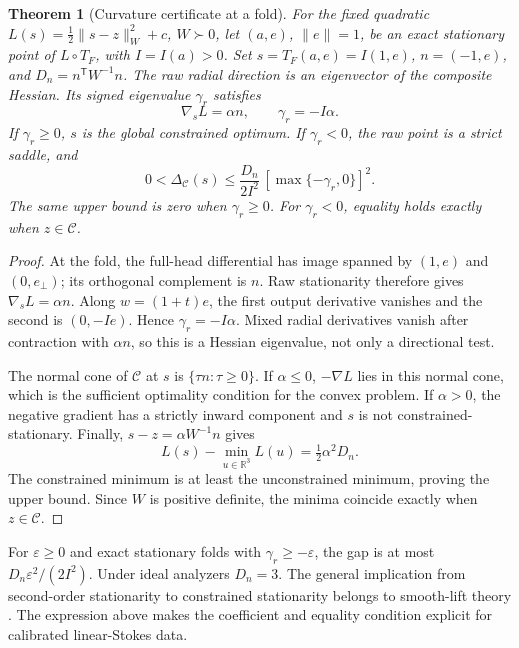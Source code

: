 \documentclass[10pt,a4paper]{article}
\newtheorem{theorem}{Theorem}
\begin{document}
\begin{theorem}[Curvature certificate at a fold]
\label{thm:certificate}
For the fixed quadratic $L(s)=\tfrac12\|s-z\|_W^2+c$, $W\succ0$, let $(a,e)$, $\|e\|=1$, be an exact stationary point of $L\circ T_F$, with $I=I(a)>0$. Set $s=T_F(a,e)=I(1,e)$, $n=(-1,e)$, and $D_n=n^{\mathsf T}W^{-1}n$. The raw radial direction is an eigenvector of the composite Hessian. Its signed eigenvalue $\gamma_r$ satisfies
\begin{equation}
 \nabla_s L=\alpha n,\qquad \gamma_r=-I\alpha.
 \label{eq:normalcurvature}
\end{equation}
If $\gamma_r\geq0$, $s$ is the global constrained optimum. If $\gamma_r<0$, the raw point is a strict saddle, and
\begin{equation}
 0<\Delta_{\mathcal C}(s)\leq
 \frac{D_n}{2I^2}\,[\max\{-\gamma_r,0\}]^2.
 \label{eq:curvaturecertificate}
\end{equation}
The same upper bound is zero when $\gamma_r\geq0$. For $\gamma_r<0$, equality holds exactly when $z\in\mathcal C$.
\end{theorem}
\begin{proof}
At the fold, the full-head differential has image spanned by $(1,e)$ and $(0,e_\perp)$; its orthogonal complement is $n$. Raw stationarity therefore gives $\nabla_sL=\alpha n$. Along $w=(1+t)e$, the first output derivative vanishes and the second is $(0,-Ie)$. Hence $\gamma_r=-I\alpha$. Mixed radial derivatives vanish after contraction with $\alpha n$, so this is a Hessian eigenvalue, not only a directional test.

The normal cone of $\mathcal C$ at $s$ is $\{\tau n:\tau\geq0\}$. If $\alpha\leq0$, $-\nabla L$ lies in this normal cone, which is the sufficient optimality condition for the convex problem. If $\alpha>0$, the negative gradient has a strictly inward component and $s$ is not constrained-stationary. Finally, $s-z=\alpha W^{-1}n$ gives
\begin{equation*}
 L(s)-\min_{u\in\mathbb R^3}L(u)=\tfrac12\alpha^2D_n.
\end{equation*}
The constrained minimum is at least the unconstrained minimum, proving the upper bound. Since $W$ is positive definite, the minima coincide exactly when $z\in\mathcal C$.
\end{proof}
For $\varepsilon\geq0$ and exact stationary folds with $\gamma_r\geq-\varepsilon$, the gap is at most $D_n\varepsilon^2/(2I^2)$. Under ideal analyzers $D_n=3$. The general implication from second-order stationarity to constrained stationarity belongs to smooth-lift theory \cite{supp-lifts}. The expression above makes the coefficient and equality condition explicit for calibrated linear-Stokes data.
\end{document}
